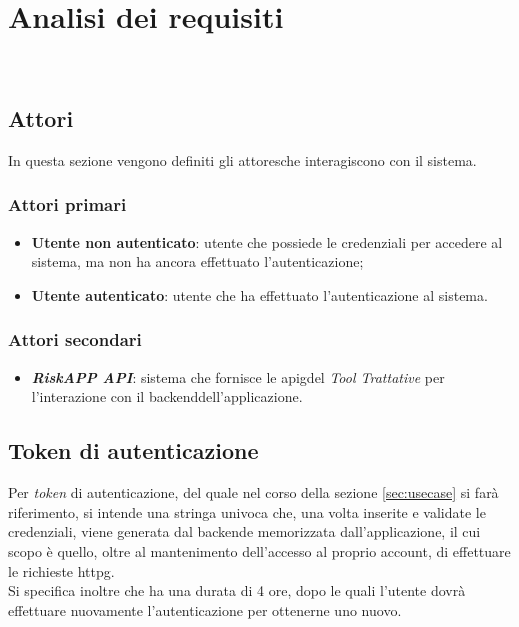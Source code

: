 \chapter{Analisi dei requisiti}
\label{cap:analisi-requisiti}

\\

\section{Attori}
\label{subsec:attori}

In questa sezione vengono definiti gli \glspl{attore}\glsoccur che interagiscono con il sistema.

\subsection{Attori primari}
\label{subsubsec:attori-primari}

\begin{itemize}
    \item \textbf{Utente non autenticato}: utente che possiede le credenziali per accedere al sistema, ma non ha ancora effettuato l'autenticazione;
    \item \textbf{Utente autenticato}: utente che ha effettuato l'autenticazione al sistema.
\end{itemize}

\subsection{Attori secondari}
\label{subsubsec:attori-secondari}

\begin{itemize}
    \item \textbf{\emph{RiskAPP API}}: sistema che fornisce le \gls{apig}\glsoccur del \emph{Tool Trattative} per l'interazione con il \gls{backend}\glsoccur dell'applicazione.
\end{itemize}

\section{Token di autenticazione}
\label{subsec:token-autenticazione}

Per \emph{token} di autenticazione, del quale nel corso della sezione \ref{sec:usecase} si farà riferimento, si intende una stringa univoca che, una volta inserite e validate le credenziali, viene generata dal \gls{backend}\glsoccur e memorizzata dall'applicazione, il cui scopo è quello, oltre al mantenimento dell'accesso al proprio account, di effettuare le richieste \gls{httpg}\glsoccur.\\
Si specifica inoltre che ha una durata di 4 ore, dopo le quali l'utente dovrà effettuare nuovamente l'autenticazione per ottenerne uno nuovo.


